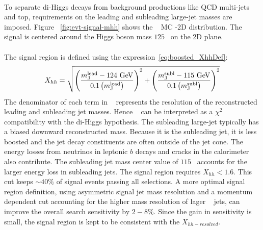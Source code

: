 \paragraph{}
To separate di-Higgs decays from background productions like QCD multi-jets and top, requirements on the leading and subleading large-\R jet masses are imposed.
Figure ~\ref{fig:evt-signal-mhh} shows the \Grav~ MC \mlead-\msubl 2D distribution.
The signal is centered around the Higgs boson mass $125$\GeV~ on the 2D plane.

\paragraph{}
The signal region is defined using the expression~\ref{eq:boosted_XhhDef}:
\begin{equation}
\label{eq:boosted_XhhDef}
X_{hh} = \sqrt{\left(\frac{m^{\rm lead}_{\rm J} - \text{124 GeV}}{0.1 \left(m^{\rm lead}_{\rm J}\right)}\right)^2 + \left(\frac{m^{\rm subl}_{\rm J}- \text{115 GeV}}{0.1 \left(m^{\rm subl}_{\rm J}\right)}\right)^2}
\end{equation}
The denominator of each term in \Xhh~ represents the resolution of the reconstructed leading and subleading jet masses.
Hence \Xhh~ can be interpreted as a $\chi^2$ compatibility with the di-Higgs hypothesis.
The subleading large-\R jet typically has a biased downward reconstructed mass.
Because it is the subleading jet, it is less boosted and the jet decay constituents are often outside of the jet cone.
The energy losses from neutrinos in leptonic $b$ decays and cracks in the calorimeter also contribute.
The subleading jet mass center value of $115$\GeV~ accounts for the larger energy loss in subleading jets.
The signal region requires $X_{hh} < 1.6$. 
This cut keeps $\sim 40\%$ of signal events passing all selections. 
A more optimal signal region definition, using asymmetric signal jet mass resolution and a momentum dependent cut accounting for the higher mass resolution of lager \pt~ jets, can improve the overall search sensitivity by $2-8\%$.
Since the gain in sensitivity is small, the signal region is kept to be consistent with the $X_{hh-resolved}$.


